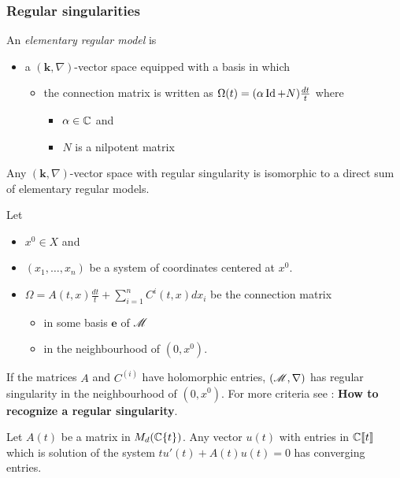 \subsubsection{Regular singularities}
\begin{defn}
  An \emph{elementary regular model} is
  \begin{itemize}
    \item a $(\textbf{k},\nabla)$-vector space
      equipped with a basis in which
      \begin{itemize}
        \item the connection matrix is written as
          $\Omega(t)=(\alpha\operatorname{Id}+N)\frac{dt}{t}$
          where
          \begin{itemize}
            \item $\alpha\in\mathbb{C}$ and
            \item $N$ is a nilpotent matrix
          \end{itemize}
      \end{itemize}
  \end{itemize}
\end{defn}
\begin{cor}[II.2.9]
  Any $(\textbf{k},\nabla)$-vector space with regular singularity is isomorphic
  to a direct sum of elementary regular models.
\end{cor}
Let
\begin{itemize}
  \item $x^0\in X$ and
  \item $(x_1,\dots,x_n)$ be a system of coordinates centered at $x^0$.
  \item $\Omega=A(t,x)\frac{dt}{t}+\sum_{i=1}^nC^{i}(t,x)dx_i$ be the
    connection matrix
    \begin{itemize}
      \item in some basis $\textbf{e}$ of $\mathscr{M}$
      \item in the neighbourhood of $(0,x^0)$.
    \end{itemize}
\end{itemize}
If the matrices $A$ and $C^{(i)}$ have holomorphic entries, $(\mathscr{M},\nabla)$ has
regular singularity in the neighbourhood of $(0,x^0)$. For more criteria see
\cite[II.4.a]{sabbah2007isomonodromic}: \textbf{How to recognize a regular
  singularity}.
\begin{prop}
  Let $A(t)$ be a matrix in $M_d(\mathbb{C}\{t\})$. Any vector $u(t)$ with entries in
  $\mathbb{C}\llbracket t\rrbracket$ which is solution of the system
  $tu'(t)+A(t)u(t)=0$ has converging entries.
\end{prop}
